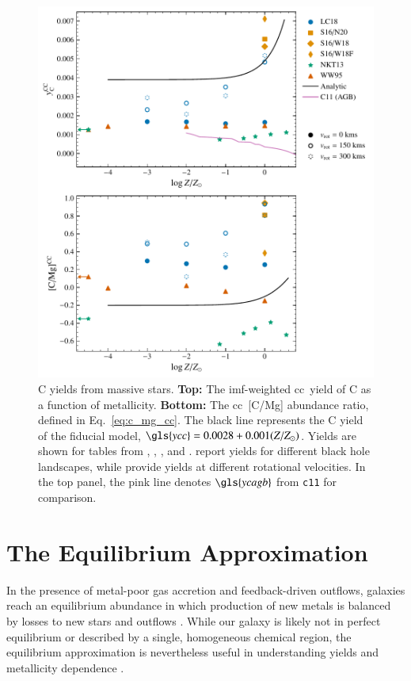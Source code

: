 \documentclass[12pt,oneside,letterpaper]{report}
\newcommand{\cc}{\gls{cc}}
\newcommand{\imf}{\gls{imf}}
\newcommand{\cxi}{\texttt{\gls{c11}}}
\newcommand{\Ycc}{\gls{ycc}}
\newcommand{\Ycagb}{\gls{ycagb}}
\begin{document}
\begin{figure}[htp]
    \centering
    \includegraphics{y_c_cc.pdf}
    \caption[Massive star C yields]{
        C yields from massive stars.
        \textbf{Top:} The \imf-weighted \cc\ yield of C as a function of metallicity.
        \textbf{Bottom:} The \cc\ [C/Mg] abundance ratio, defined in Eq.~\ref{eq:c_mg_cc}. The black line represents the C yield of the fiducial model,
    $\Ycc = 0.0028 + 0.001 (Z/Z_{\odot})$. Yields are shown for tables from 
    \citet[red triangles]{WW95}, \citet[orange squares and diamonds]{sukhbold+16}, 
    \citet[green stars]{NKT13}, and \citet[blue circles]{LC18}. \citet{sukhbold+16} report yields for different black hole landscapes, while \citet{LC18} provide yields at different rotational velocities.
    In the top panel, the pink line denotes $\Ycagb$ from \cxi{} for comparison.
}
    \label{fig:y_cc}
\end{figure}

\chapter{The Equilibrium Approximation}\label{sec:equilibrium}

In the presence of metal-poor gas accretion and feedback-driven outflows, galaxies reach an equilibrium abundance in which production of new metals is balanced by losses to new stars and outflows \citep{larson72, dalcanton07, FD08, PS11, lilly13}.
While our galaxy is likely not in perfect equilibrium or described by a single, homogeneous chemical region, the equilibrium approximation is nevertheless useful in understanding yields and metallicity dependence \citep[e.g.][]{james_dwarf,james+23,WAF17}. 
\end{document}
